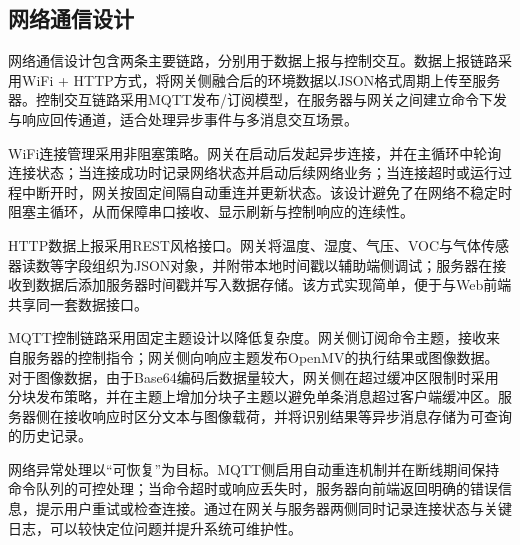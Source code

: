 \subsection{网络通信设计}
\par 网络通信设计包含两条主要链路，分别用于数据上报与控制交互。数据上报链路采用WiFi + HTTP方式，将网关侧融合后的环境数据以JSON格式周期上传至服务器。控制交互链路采用MQTT发布/订阅模型，在服务器与网关之间建立命令下发与响应回传通道，适合处理异步事件与多消息交互场景\cite{mqtt_oasis}。
\par WiFi连接管理采用非阻塞策略。网关在启动后发起异步连接，并在主循环中轮询连接状态；当连接成功时记录网络状态并启动后续网络业务；当连接超时或运行过程中断开时，网关按固定间隔自动重连并更新状态。该设计避免了在网络不稳定时阻塞主循环，从而保障串口接收、显示刷新与控制响应的连续性。
\par HTTP数据上报采用REST风格接口。网关将温度、湿度、气压、VOC与气体传感器读数等字段组织为JSON对象，并附带本地时间戳以辅助端侧调试；服务器在接收到数据后添加服务器时间戳并写入数据存储。该方式实现简单，便于与Web前端共享同一套数据接口。
\par MQTT控制链路采用固定主题设计以降低复杂度。网关侧订阅命令主题，接收来自服务器的控制指令；网关侧向响应主题发布OpenMV的执行结果或图像数据。对于图像数据，由于Base64编码后数据量较大，网关侧在超过缓冲区限制时采用分块发布策略，并在主题上增加分块子主题以避免单条消息超过客户端缓冲区。服务器侧在接收响应时区分文本与图像载荷，并将识别结果等异步消息存储为可查询的历史记录。
\par 网络异常处理以“可恢复”为目标。MQTT侧启用自动重连机制并在断线期间保持命令队列的可控处理；当命令超时或响应丢失时，服务器向前端返回明确的错误信息，提示用户重试或检查连接。通过在网关与服务器两侧同时记录连接状态与关键日志，可以较快定位问题并提升系统可维护性。

